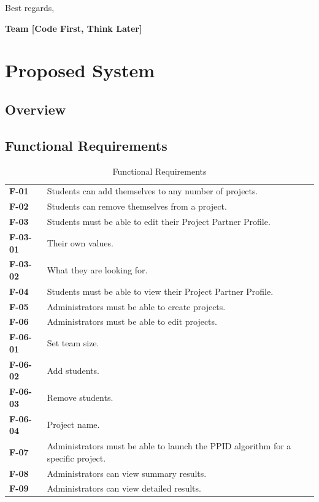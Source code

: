 \documentclass[12pt,letterpaper]{article}
\begin{document}
\noindent Best regards,

\vspace{1em}

\textbf{Team [Code First, Think Later]}

\newpage{}

\section{Proposed System}

\subsection{Overview}


\subsection{Functional Requirements}

\begin{table}[H]
\caption{Functional Requirements}
\renewcommand{\arraystretch}{1.5}
\everyrow{\hline}
\begin{tabu} to 
F-01 & Students can add themselves to any number of projects. \\
F-02 & Students can remove themselves from a project. \\
F-03 & Students must be able to edit their Project Partner Profile. \\
\hspace{1 pc}F-03-01 & \hspace{2 pc}Their own values. \\
\hspace{1 pc}F-03-02 & \hspace{2 pc}What they are looking for. \\
F-04 & Students must be able to view their Project Partner Profile. \\
F-05 & Administrators must be able to create projects. \\
F-06 & Administrators must be able to edit projects. \\
\hspace{1 pc}F-06-01 & \hspace{2 pc}Set team size. \\
\hspace{1 pc}F-06-02 & \hspace{2 pc}Add students. \\
\hspace{1 pc}F-06-03 & \hspace{2 pc}Remove students. \\
\hspace{1 pc}F-06-04 & \hspace{2 pc}Project name. \\
F-07 & Administrators must be able to launch the PPID algorithm for a specific project. \\
F-08 & Administrators can view summary results. \\
F-09 & Administrators can view detailed results.
\end{tabu}
\end{table}
\end{document}
